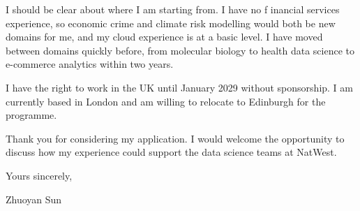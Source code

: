 \documentclass[letterpaper,11pt]{article}
\begin{document}
I should be clear about where I am starting from. I have no f\kern0pt inancial services experience, so economic crime and climate risk modelling would both be new domains for me, and my cloud experience is at a basic level. I have moved between domains quickly before, from molecular biology to health data science to e-commerce analytics within two years.

I have the right to work in the UK until January 2029 without sponsorship. I am currently based in London and am willing to relocate to Edinburgh for the programme.

Thank you for considering my application. I would welcome the opportunity to discuss how my experience could support the data science teams at NatWest.

\vspace{2pt}
Yours sincerely,

\vspace{8pt}
Zhuoyan Sun
\end{document}
